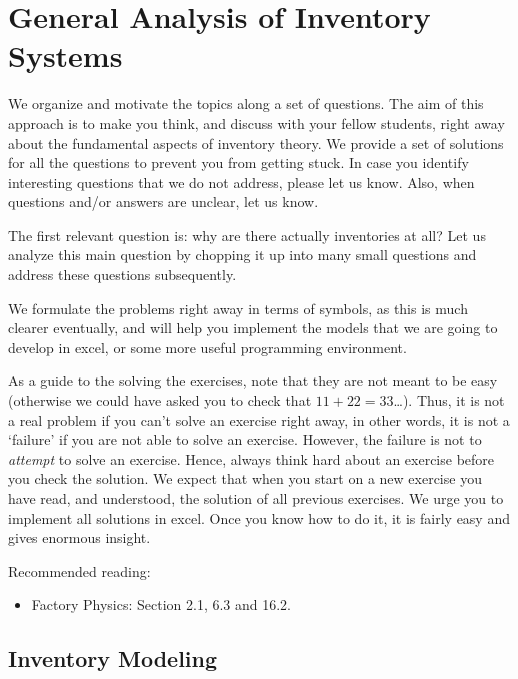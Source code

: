 \section{General Analysis of Inventory Systems}


We organize and motivate the topics along a set of questions.  The aim
of this approach is to make you think, and discuss with your fellow
students, right away about the fundamental aspects of inventory
theory.  We provide a set of solutions for all the questions to
prevent you from getting stuck.  In case you identify interesting
questions that we do not address, please let us know. Also, when
questions and/or answers are unclear, let us know.

The first relevant question is: why are there actually inventories at
all? Let us analyze this main question by chopping it up into many
small questions and address these questions subsequently. 

We formulate the problems right away in terms of symbols, as this is
much clearer eventually, and will help you implement the models that
we are going to develop in excel, or some more useful programming
environment.


As a guide to the solving the exercises, note that they are not meant
to be easy (otherwise we could have asked you to check that
$11+22=33$\ldots). Thus, it is not a real problem if you can't solve
an exercise right away, in other words, it is not a `failure' if you
are not able to solve an exercise. However, the failure is not to
\emph{attempt} to solve an exercise. Hence, always think hard about an
exercise before you check the solution.  We expect that when you start
on a new exercise you have read, and understood, the solution of all
previous exercises. We urge you to implement all solutions in
excel. Once you know how to do it, it is fairly easy and gives
enormous insight.



Recommended reading:
\begin{itemize}
\item Factory Physics: Section 2.1, 6.3 and  16.2. 
\end{itemize}

\subsection{Inventory Modeling}
\label{sec:inventory-modeling}

